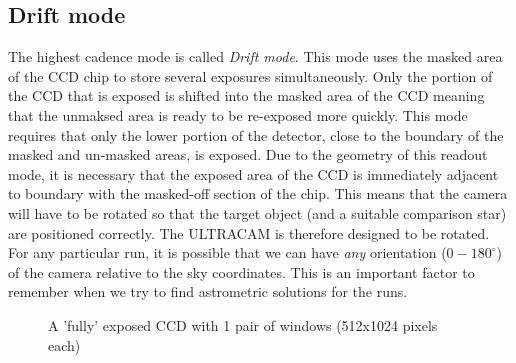 \subsection{Drift mode}
The highest cadence mode is called \emph{Drift mode}. This mode uses the masked area of the CCD chip to store several exposures simultaneously. Only the portion of the CCD that is exposed is shifted into the masked area of the CCD meaning that the unmaksed area is ready to be re-exposed more quickly. This mode requires that only the lower portion of the detector, close to the boundary of the masked and un-masked areas, is exposed. Due to the geometry of this readout mode, it is necessary that the exposed area of the CCD is immediately adjacent to boundary with the masked-off section of the chip. This means that the camera will have to be rotated so that the target object (and a suitable comparison star) are positioned correctly. The ULTRACAM is therefore designed to be rotated. For any particular run, it is possible that we can have \emph{any} orientation ($0-180^{\circ}$) of the camera relative to the sky coordinates. This is an important factor to remember when we try to find astrometric solutions for the runs.    

\begin{figure}
  \centering
  \setlength{\fboxsep}{0pt}
  \setlength{\fboxrule}{1pt}
  \caption{A 'fully' exposed CCD with 1 pair of windows (512x1024 pixels each)}
  \label{fig:KOI-824}
\end{figure}

